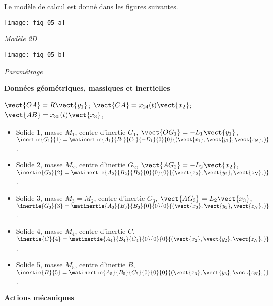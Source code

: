 \begin{multicols}{2}
Le modèle de calcul est donné dans les figures suivantes.

\begin{center}
\texttt{[image: fig\_05\_a]}

\textit{Modèle 2D}
\end{center}

\begin{center}
\texttt{[image: fig\_05\_b]}

\textit{Paramétrage}
\end{center}

\textbf{Données géométriques, massiques et inertielles}
\begin{multicols}{2}
\footnotesize

$\vect{OA}=R\vect{y_1}$; $\vect{CA}=x_{24}(t)\vect{x_2}$; $\vect{AB}=x_{35}(t)\vect{x_3}$, 
\begin{itemize}
\item Solide 1, masse $M_1$, centre d'inertie $G_1$, $\vect{OG_1}=-L_1\vect{y_1}$, $\inertie{G_1}{1}=\matinertie{A_1}{B_1}{C_1}{-D_1}{0}{0}{\left(\vect{x_1},\vect{y_1},\vect{z_N}, \right)}$.
\item Solide 2, masse $M_2$, centre d'inertie $G_2$, $\vect{AG_2}=-L_2\vect{x_2}$, $\inertie{G_2}{2}=\matinertie{A_2}{B_2}{B_2}{0}{0}{0}{\left(\vect{x_2},\vect{y_2},\vect{z_N}, \right)}$.
\item Solide 3, masse $M_3=M_2$, centre d'inertie $G_3$, $\vect{AG_3}=L_2\vect{x_3}$, $\inertie{G_3}{3}=\matinertie{A_3}{B_3}{B_3}{0}{0}{0}{\left(\vect{x_3},\vect{y_3},\vect{z_N}, \right)}$.
\item Solide 4, masse $M_4$, centre d'inertie $C$, $\inertie{C}{4}=\matinertie{A_4}{B_4}{C_4}{0}{0}{0}{\left(\vect{x_2},\vect{y_2},\vect{z_N}, \right)}$.
\item Solide 5, masse $M_5$, centre d'inertie $B$, $\inertie{B}{5}=\matinertie{A_5}{B_5}{C_5}{0}{0}{0}{\left(\vect{x_3},\vect{y_3},\vect{z_N}, \right)}$.
\end{itemize}
\normalsize

\end{multicols}

\textbf{Actions mécaniques}


\end{multicols}
